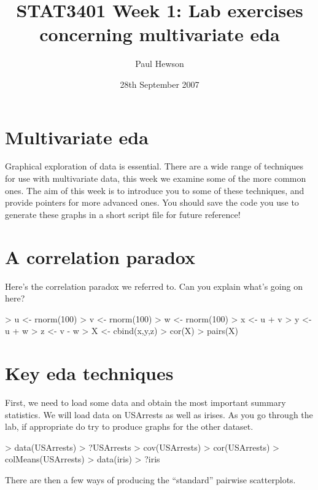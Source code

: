 \documentclass[11pt]{article}
\title{STAT3401 Week 1: Lab exercises concerning multivariate eda}
\author{Paul Hewson}
\date{28th September 2007}
\begin{document}
\setlength{\parindent}{0pt}
\setlength{\parskip}{12pt}
\sffamily
\maketitle


\section{Multivariate eda}

Graphical exploration of data is essential.   There are a wide range of techniques for use with multivariate data, this week we examine some of the more common ones.   The aim of this week is to introduce you to some of these techniques, and provide pointers for more advanced ones.   You should save the code you use to generate these graphs in a short script file for future reference!


\section{A correlation paradox}

Here's the correlation paradox we referred to.   Can you explain what's going on here?

\begin{Schunk}
\begin{Sinput}
> u <- rnorm(100)
> v <- rnorm(100)
> w <- rnorm(100)
> x <- u + v
> y <- u + w
> z <- v - w
> X <- cbind(x,y,z)
> cor(X)
> pairs(X)
\end{Sinput}
\end{Schunk}


\section{Key eda techniques}

First, we need to load some data and obtain the most important summary statistics.   We will load data on USArrests as well as irises.   As you go through the lab, if appropriate do try to produce graphs for the other dataset.

\begin{Schunk}
\begin{Sinput}
> data(USArrests)
> ?USArrests
> cov(USArrests)
> cor(USArrests)
> colMeans(USArrests)
> data(iris)
> ?iris
\end{Sinput}
\end{Schunk}

There are then a few ways of producing the ``standard'' pairwise scatterplots.
\end{document}

